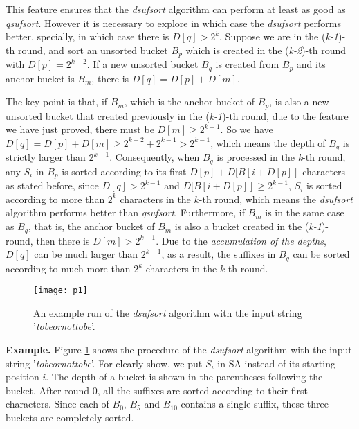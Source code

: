 \documentclass{ws-ijprai}
\begin{document}
This feature ensures that the
\emph{dsufsort} algorithm can perform at least as good as
\emph{qsufsort}. However it is necessary to explore in which case the
\emph{dsufsort} performs better, specially, in which
case there is $D[q] > 2^k$. Suppose we are in the (\emph{k-1})-th
round, and sort an unsorted bucket $B_p$ which is created in the
(\emph{k-2})-th round with $D[p] = 2^{k-2}$. If a new unsorted
bucket $B_q$ is created from $B_p$ and its anchor bucket is $B_m$,
there is $D[q] = D[p] + D[m]$.

The key point is that, if $B_m$, which is the anchor bucket of $B_p$,
is also a new unsorted bucket that created previously in the
(\emph{k-1})-th round, due to the feature we have just proved, there
must be $D[m] \geq 2^{k-1}$. So we have $D[q] = D[p] + D[m] \geq
2^{k-2} + 2^{k-1} > 2^{k-1}$, which means the depth of $B_q$ is
strictly larger than $2^{k-1}$. Consequently, when $B_q$ is processed
in the \emph{k}-th round, any $S_i$ in $B_p$ is sorted according to
its first $D[p] + D[B[i+D[p]]$ characters as stated before, since
$D[q] > 2^{k-1}$ and $D[B[i+D[p]] \geq 2^{k-1}$, $S_i$ is sorted
according to more than $2^k$ characters in the $k$-th round, which
means the \emph{dsufsort} algorithm performs better than \emph{qsufsort}. Furthermore, if
$B_m$ is in the same case as $B_q$, that is, the anchor bucket of
$B_m$ is also a bucket created in the (\emph{k-1})-round, then there
is $D[m] > 2^{k-1}$. Due to the \emph{accumulation of the depths},
$D[q]$ can be much larger than $2^{k-1}$, as a result, the suffixes in
$B_q$ can be sorted according to much more than $2^k$ characters in
the $k$-th round.

\begin{figure}[bh]
\centerline{\texttt{[image: p1]}}
\vspace*{8pt}
\caption{An example run of the \emph{dsufsort} algorithm with the input
    string '\emph{tobeornottobe}'.}
\label{fig:1}
\end{figure}

\textbf{Example.} Figure \ref{fig:1} shows the procedure of the
\emph{dsufsort} algorithm with the input string
'\emph{tobeornottobe}'. For clearly show, we put $S_i$ in SA instead
of its starting position $i$. The depth of a bucket is shown in the
parentheses following the bucket. After round 0, all the suffixes are
sorted according to their first characters. Since each of $B_0$, $B_5$
and $B_{10}$ contains a single suffix, these three buckets are completely sorted.
\end{document}

